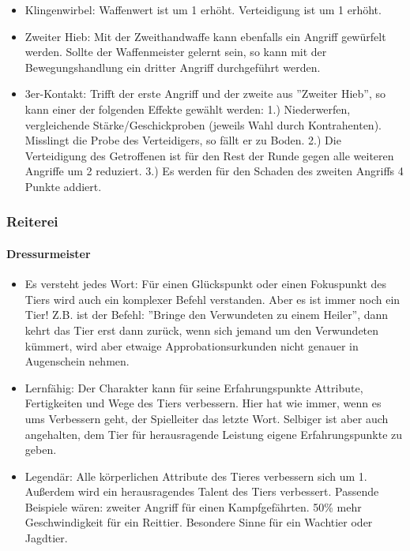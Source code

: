 \documentclass{article}
\begin{document}
\begin{itemize}
\item Klingenwirbel: Waffenwert ist um 1 erhöht. Verteidigung ist um 1 erhöht.
\item Zweiter Hieb: Mit der Zweithandwaffe kann ebenfalls ein Angriff gewürfelt werden. Sollte der Waffenmeister gelernt sein, so kann mit der Bewegungshandlung ein dritter Angriff durchgeführt werden.
\item 3er-Kontakt: Trifft der erste Angriff und der zweite aus ''Zweiter Hieb'', so kann einer der folgenden Effekte gewählt werden: 1.) Niederwerfen, vergleichende Stärke/Geschickproben (jeweils Wahl durch Kontrahenten). Misslingt die Probe des Verteidigers, so fällt er zu Boden. 2.) Die Verteidigung des Getroffenen ist für den Rest der Runde gegen alle weiteren Angriffe um 2 reduziert. 3.) Es werden für den Schaden des zweiten Angriffs 4 Punkte addiert.
\end{itemize}

\subsubsection{Reiterei}

\paragraph{Dressurmeister}

\begin{itemize}
\item Es versteht jedes Wort: Für einen Glückspunkt oder einen Fokuspunkt des Tiers wird auch ein komplexer Befehl verstanden. Aber es ist immer noch ein Tier! Z.B. ist der Befehl: ''Bringe den Verwundeten zu einem Heiler'', dann kehrt das Tier erst dann zurück, wenn sich jemand um den Verwundeten kümmert, wird aber etwaige Approbationsurkunden nicht genauer in Augenschein nehmen.
\item Lernfähig: Der Charakter kann für seine Erfahrungspunkte Attribute, Fertigkeiten und Wege des Tiers verbessern. Hier hat wie immer, wenn es ums Verbessern geht, der Spielleiter das letzte Wort. Selbiger ist aber auch angehalten, dem Tier für herausragende Leistung eigene Erfahrungspunkte zu geben.
\item Legendär: Alle körperlichen Attribute des Tieres verbessern sich um 1. Außerdem wird ein herausragendes Talent des Tiers verbessert. Passende Beispiele wären: zweiter Angriff für einen Kampfgefährten. 50\% mehr Geschwindigkeit für ein Reittier. Besondere Sinne für ein Wachtier oder Jagdtier.
\end{itemize}
\end{document}
